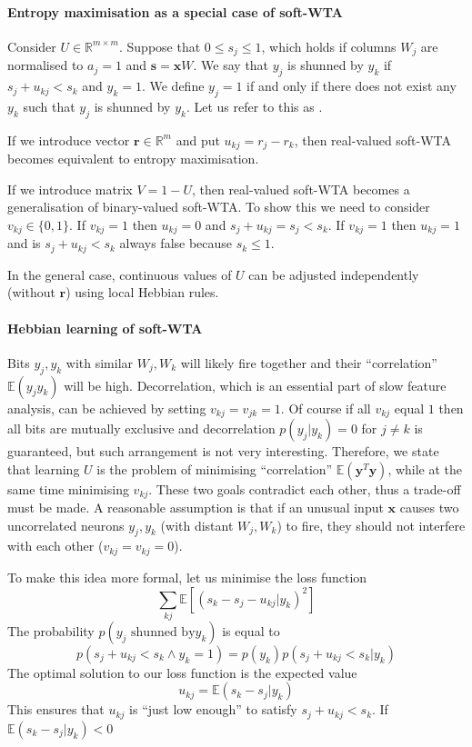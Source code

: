 \documentclass[12pt]{article}
\begin{document}
\paragraph{Entropy maximisation as a special case of soft-WTA}

Consider $U \in \mathbb{R}^{m\times m}$. Suppose that $0\le s_j\le 1$, which holds if columns $W_j$ are normalised to $a_j=1$ and $\boldsymbol{s}=\boldsymbol{x} W$. 
We say that $y_j$ is shunned by $y_k$ if  $s_j+u_{kj}<s_k$ and $y_k=1$. We define $y_j=1$ if and only if there does not exist any $y_k$ such that  $y_j$ is shunned by $y_k$. Let us refer to this as .

If we introduce vector $\boldsymbol{r}\in \mathbb{R}^m$ and put $u_{kj}=r_j-r_k$, then real-valued soft-WTA becomes equivalent to entropy maximisation. 

If we introduce matrix $V=1-U$, then real-valued soft-WTA becomes a generalisation of binary-valued soft-WTA. To show this we need to consider $v_{kj} \in \{0,1\}$. If $v_{kj}=1$ then $u_{kj}=0$ and $s_j+u_{kj}=s_j<s_k$. If $v_{kj}=1$ then $u_{kj}=1$ and is $s_j+u_{kj}<s_k$ always false because $s_k \le  1$. 

In the general case, continuous values of $U$ can be adjusted independently (without $\boldsymbol{r}$) using local Hebbian rules.  

\paragraph{Hebbian learning of soft-WTA}
Bits $y_j,y_k$ with similar $W_j,W_k$ will likely fire together and their ``correlation'' $\mathbb{E}(y_j y_k)$ will be high. Decorrelation, which is an essential part of slow feature analysis, can be achieved by setting $v_{kj}=v_{jk}=1$. Of course if all $v_{kj}$ equal $1$ then all bits are mutually exclusive and decorrelation $p(y_j|y_k) = 0$ for $j\ne k$ is guaranteed, but such arrangement is not very interesting. Therefore, we state that learning $U$ is the problem of minimising ``correlation'' $\mathbb{E}(\boldsymbol{y}^T \boldsymbol{y})$, while at the same time minimising $v_{kj}$. These two goals contradict each other, thus a trade-off  must be made. A reasonable assumption is that if an unusual input $\boldsymbol{x}$ causes two uncorrelated neurons $y_j,y_k$ (with distant $W_j,W_k$) to fire, they should not interfere with each other ($v_{kj}=v_{kj}=0$). 

To make this idea more formal, let us minimise the loss function
\[
\sum_{kj}\mathbb{E}[(s_k-s_j - u_{kj}|y_k)^2]
\]
The probability $p(y_j\text{ shunned by} y_k)$ is equal to
\[
p(s_j+u_{kj}<s_k \wedge y_k=1) = p(y_k)p(s_j+u_{kj}<s_k|y_k)
\]
The optimal solution to our loss function is the expected value
\[u_{kj}=\mathbb{E}(s_k-s_j|y_k)\]
This ensures that $u_{kj}$ is ``just low enough'' to satisfy $s_j+u_{kj}<s_k$.
If $\mathbb{E}(s_k-s_j|y_k) < 0$ 
\end{document}
